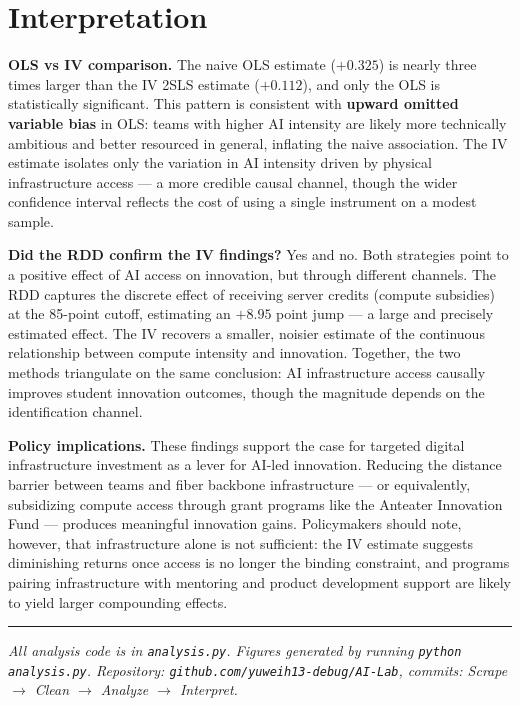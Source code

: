 \documentclass[12pt]{article}
\begin{document}
\section{Interpretation}

\textbf{OLS vs IV comparison.}
The naive OLS estimate ($+0.325$) is nearly three times larger than the IV 2SLS
estimate ($+0.112$), and only the OLS is statistically significant. This pattern is
consistent with \textbf{upward omitted variable bias} in OLS: teams with higher
AI intensity are likely more technically ambitious and better resourced in general,
inflating the naive association. The IV estimate isolates only the variation in AI
intensity driven by physical infrastructure access --- a more credible causal channel,
though the wider confidence interval reflects the cost of using a single instrument
on a modest sample.

\textbf{Did the RDD confirm the IV findings?}
Yes and no. Both strategies point to a positive effect of AI access on innovation,
but through different channels. The RDD captures the discrete effect of receiving
server credits (compute subsidies) at the 85-point cutoff, estimating an $+8.95$
point jump --- a large and precisely estimated effect. The IV recovers a smaller,
noisier estimate of the continuous relationship between compute intensity and innovation.
Together, the two methods triangulate on the same conclusion: AI infrastructure access
causally improves student innovation outcomes, though the magnitude depends on the
identification channel.

\textbf{Policy implications.}
These findings support the case for targeted digital infrastructure investment as a
lever for AI-led innovation. Reducing the distance barrier between teams and fiber
backbone infrastructure --- or equivalently, subsidizing compute access through grant
programs like the Anteater Innovation Fund --- produces meaningful innovation gains.
Policymakers should note, however, that infrastructure alone is not sufficient: the
IV estimate suggests diminishing returns once access is no longer the binding constraint,
and programs pairing infrastructure with mentoring and product development support
are likely to yield larger compounding effects.

\vspace{2em}\hrule\vspace{0.5em}
\footnotesize
\textit{All analysis code is in \texttt{analysis.py}. Figures generated by running
\texttt{python analysis.py}. Repository: \texttt{github.com/yuweih13-debug/AI-Lab},
commits: Scrape $\to$ Clean $\to$ Analyze $\to$ Interpret.}
\end{document}
